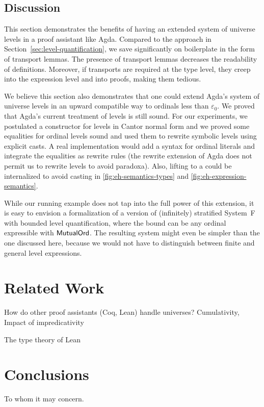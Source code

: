 \documentclass[manuscript,screen,review,anonymous]{acmart}
\begin{document}
\subsection{Discussion}
\label{sec:discussion-2}

This section demonstrates the benefits of having an extended system of
universe levels in a proof assistant like Agda. Compared to the
approach in Section~\cref{sec:level-quantification}, we save
significantly on boilerplate in the form of transport lemmas. The
presence of transport lemmas decreases the readability of
definitions. Moreover, if transports are required at the type level,
they creep into the expression level and into proofs, making them tedious.

We believe this section also demonstrates that one could extend Agda's
system of universe levels in an upward compatible way to ordinals less
than $\varepsilon_0$. We proved that Agda's current treatment of
levels is still sound. For our experiments, we postulated a
constructor for levels in Cantor normal form and we proved some
equalities for ordinal levels sound and used them to rewrite symbolic
levels using explicit casts. A real implementation would add a syntax
for ordinal literals and integrate the equalities as rewrite rules
(the rewrite extension of Agda does not permit us to rewrite levels to
avoid paradoxa). Also, lifting to a {\ABoundedLevel} could be
internalized to avoid casting in \cref{fig:eh-semantics-types} and
\cref{fig:eh-expression-semantics}. 


While our running example does not tap into the
full power of this extension, it is easy to envision a formalization
of a version of (infinitely) stratified System~F with bounded level quantification,
where the bound can be any ordinal expressible with $\AMutualOrd$. The
resulting system might even be simpler than the one discussed here,
because we would not have to distinguish between finite and general
level expressions.



\section{Related Work}
\label{sec:related-work}

How do other proof assistants (Coq, Lean) handle universes?
Cumulativity, Impact of impredicativity

The type theory of Lean \cite{carneiro19:_type_theor_lean}

\section{Conclusions}
\label{sec:conclusions}


\begin{acks}
  To whom it may concern.
\end{acks}



\end{document}
